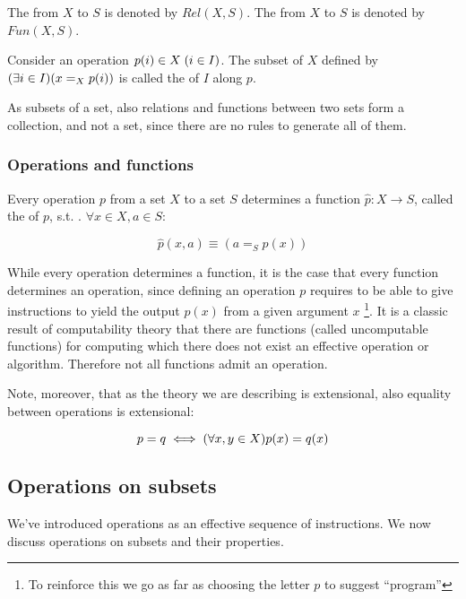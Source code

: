 
The  from $X$ to $S$ is denoted by
$Rel(X, S)$.  The  from \(X\) to
\(S\) is denoted by \(Fun(X, S)\).

Consider an operation $p(i) \in X \; (i \in I)$. The subset of $X$ defined
by $(\exists i \in I)(x =_X p(i))$ is called the  of \(I\)
along \(p\).

As subsets of a set, also relations and functions between two sets
form a collection, and not a set, since there are no rules to
generate all of them.

\subsubsection{Operations and functions}

Every operation \(p\) from a set \(X\) to a set \(S\) determines a
function \(\hat{p} : X \rightarrow S\), called the  of
\(p\), s.t. .  $\forall x \in X, a \in S$:

\[ \hat{p}(x,a) \equiv (a =_S p(x))\]

While every operation determines a function, it is  the case that
every function determines an operation, since defining an operation $p$ requires
to be able to give instructions to yield the output $p(x)$ from a given argument
$x$
\footnote{To reinforce this we go as far as choosing the letter $p$ to suggest
  ``program''}.
It is a classic result of computability theory that there are
functions (called uncomputable functions) for computing which there
does not exist an effective operation or algorithm. Therefore not all
functions admit an operation.

Note, moreover, that as the theory we are describing is extensional, also
equality between operations is extensional:

\[
  p = q \iff (\forall x,y \in X)p(x) = q(x)
\]

\subsection{Operations on subsets}

We've introduced operations as an effective sequence of instructions.
We now discuss operations on subsets and their properties.

